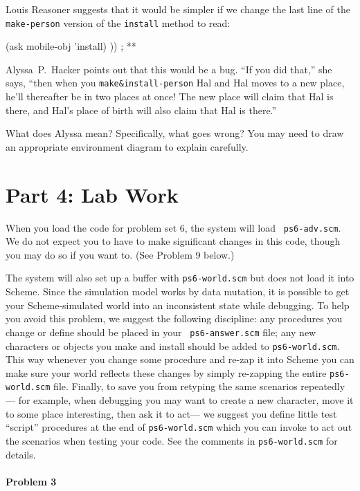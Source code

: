 Louis Reasoner suggests that it would be simpler if we change the
last line of the {\tt make-person} version of the {\tt install} method to read:

\beginlisp
               (ask mobile-obj 'install) ))   ; **
\endlisp

Alyssa~P.\ Hacker points out that this would be a bug.  ``If you did
that,'' she says, ``then when you {\tt make\&install-person} Hal and
Hal moves to a new place, he'll thereafter be in two places at once!
The new place will claim that Hal is there, and Hal's place of birth
will also claim that Hal is there.''

What does Alyssa mean?  Specifically, what goes wrong? You may need to
draw an appropriate environment diagram to explain carefully.

\section{Part 4: Lab Work}

When you load the code for problem set 6, the system will load {\tt
ps6-adv.scm}.  We do not expect you to have to make significant
changes in this code, though you may do so if you want to.  (See
Problem 9 below.)

The system will also set up a buffer with {\tt ps6-world.scm} but does not load
it
into {\sc Scheme}.  Since the simulation model works by data mutation, it is
possible to get your {\sc Scheme}-simulated world into an inconsistent state
while debugging.  To help you avoid this problem, we suggest the following
discipline: any procedures you change or define should be placed in your {\tt
ps6-answer.scm} file; any new characters or objects you make and install should
be added to {\tt ps6-world.scm}.  This way whenever you change some procedure
and re-zap it into {\sc Scheme} you can make sure your world reflects these
changes by simply re-zapping the entire {\tt ps6-world.scm} file.  Finally, to
save you from retyping the same scenarios repeatedly--- for example, when
debugging you may want to create a new character, move it to some place
interesting, then ask it to act--- we suggest you define little test ``script''
procedures at the end of {\tt ps6-world.scm} which you can invoke to act out
the scenarios when testing your code.  See the comments in {\tt ps6-world.scm}
for details.

\paragraph{Problem 3}

